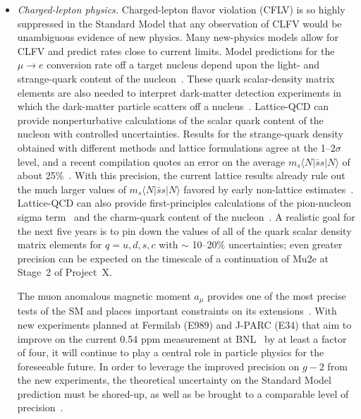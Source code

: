 \begin{itemize}
\item {\it Charged-lepton physics.}  Charged-lepton flavor violation (CFLV) is
so highly suppressed in the Standard Model that any observation of CLFV would
be unambiguous evidence of new physics.  Many new-physics models allow for
CLFV and predict rates close to current limits.  Model predictions for the
$\mu \to e$ conversion rate off a target nucleus depend upon the light- and
strange-quark content of the nucleon~\cite{Cirigliano:2009bz}.  These quark
scalar-density matrix elements are also needed to interpret dark-matter
detection experiments in which the dark-matter particle scatters off a
nucleus~\cite{Bottino:1999ei,Ellis:2008hf,Hill:2011be}.  Lattice-QCD can
provide nonperturbative calculations of the scalar quark content of the
nucleon with controlled uncertainties.  Results for the strange-quark density
obtained with different methods and lattice formulations agree at the
1--2$\sigma$ level, and a recent compilation quotes an error on the average
$m_s \langle N| \bar{s}s|N \rangle$ of about 25\%~\cite{Junnarkar:2013ac}.
With this precision, the current lattice results already rule out the much
larger values of $m_s\langle N|\bar{s}s|N\rangle$ favored by early non-lattice
estimates~\cite{Nelson:1987dg,Kaplan:1988ku,Jaffe:1989mj}.  Lattice-QCD can
also provide first-principles calculations of the pion-nucleon sigma
term~\cite{Young:2009zb,Durr:2011mp,Horsley:2011wr,Dinter:2012tt,Shanahan:2012wh}
and the charm-quark content of the nucleon~\cite{Freeman:2012ry,Gong:2013vja}.
A realistic goal for the next five years is to pin down the values of all of
the quark scalar density matrix elements for $q=u,d,s,c$ with $\sim$ 10--20\%
uncertainties; even greater precision can be expected on the timescale of a
continuation of Mu2e at Stage~2 of Project~X.

The muon anomalous magnetic moment $a_\mu$ provides one of the most precise
tests of the SM and places important constraints on its
extensions~\cite{Hewett:2012ns}.  With new experiments planned at Fermilab
(E989) and J-PARC (E34) that aim to improve on the current 0.54 ppm
measurement at BNL~\cite{Bennett:2006fi} by at least a factor of four, it will
continue to play a central role in particle physics for the foreseeable
future.  In order to leverage the improved precision on $g-2$ from the new
experiments, the theoretical uncertainty on the Standard Model prediction must
be shored-up, as well as be brought to a comparable level of
precision~\cite{Hewett:2012ns}.


\end{itemize}
